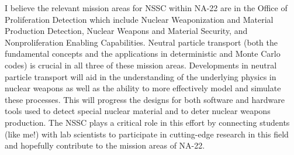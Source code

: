 \documentclass[11pt]{article}
\begin{document}

I believe the relevant mission areas for NSSC within NA-22 are in the Office of Proliferation Detection which include Nuclear Weaponization and Material Production Detection, Nuclear Weapons and Material Security, and Nonproliferation Enabling Capabilities. Neutral particle transport (both the fundamental concepts and the applications in deterministic and Monte Carlo codes) is crucial in all three of these mission areas. Developments in neutral particle transport will aid in the understanding of the underlying physics in nuclear weapons as well as the ability to more effectively model and simulate these processes. This will progress the designs for both software and hardware tools used to detect special nuclear material and to deter nuclear weapons production. The NSSC plays a critical role in this effort by connecting students (like me!) with lab scientists to participate in cutting-edge research in this field and hopefully contribute to the mission areas of NA-22. 
\end{document}
